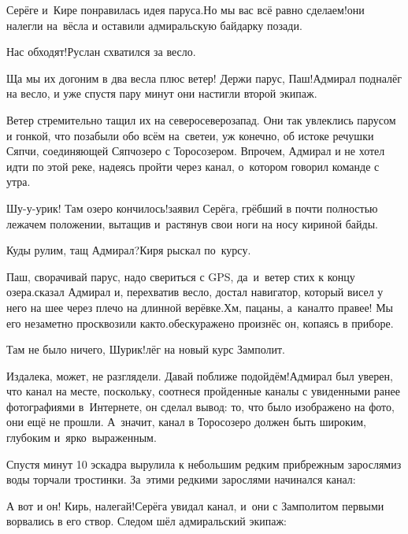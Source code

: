 
\noindent Серёге и~Кире понравилась идея паруса.\mdash Но мы вас всё равно сделаем!\mdash они налегли на~вёсла и оставили адмиральскую байдарку позади.

\diagdash Нас обходят!\mdash Руслан схватился за весло.

\diagdash Ща мы их догоним в два весла плюс ветер! Держи парус, Паш!\mdash Адмирал подналёг на весло, и уже спустя пару минут они настигли второй экипаж.

Ветер стремительно тащил их на северо\sdash северо\sdash запад. Они так увлеклись парусом и гонкой, что позабыли обо всём на~свете\mdash и, уж конечно, об истоке речушки Сяпчи, соединяющей Сяпчозеро с Торосозером. Впрочем, Адмирал и не хотел идти по этой реке, надеясь пройти через канал, о~котором говорил команде с утра.

\diagdash Шу-у-урик! Там озеро кончилось!\mdash заявил Серёга, грёбший в почти полностью лежачем положении, вытащив и~растянув свои ноги на носу кириной байды.

\diagdash Куды рулим, тащ Адмирал?\mdash Киря рыскал по~курсу.

\diagdash Паш, сворачивай парус, надо свериться с GPS, да~и~ветер стих к концу озера.\mdash сказал Адмирал и, перехватив весло, достал навигатор, который висел у него на шее через плечо на длинной верёвке.\mdash Хм, пацаны, а~канал\sdash то правее! Мы его незаметно просквозили как\sdash то.\mdash обескуражено произнёс он, копаясь в приборе.

\diagdash Там не было ничего, Шурик!\mdash лёг на новый курс Замполит.

\diagdash Издалека, может, не разглядели. Давай поближе подойдём!\mdash Адмирал был уверен, что канал на месте, поскольку, соотнеся пройденные каналы с увиденными ранее фотографиями в~Интернете, он сделал вывод: то, что было изображено на фото, они ещё не прошли.  А~значит, канал в Торосозеро должен быть широким, глубоким и~ярко~выраженным. 

Спустя минут 10 эскадра вырулила к небольшим редким прибрежным зарослям\mdash из воды торчали тростинки. За~этими редкими зарослями начинался канал:

\diagdash А вот и он! Кирь, налегай!\mdash Серёга увидал канал, и~они с Замполитом первыми ворвались в его створ. Следом шёл адмиральский экипаж:

